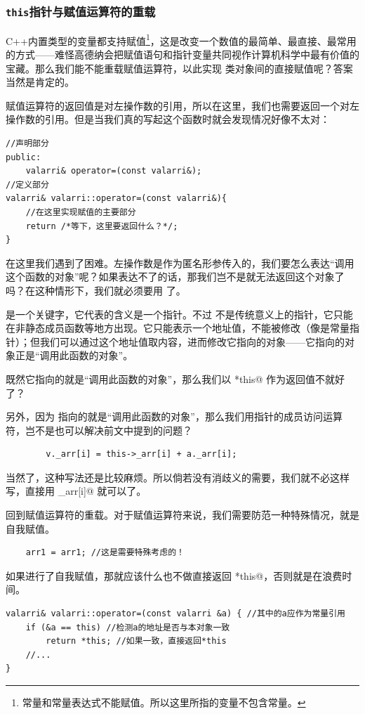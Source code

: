 \subsubsection*{\texttt{this}指针与赋值运算符的重载}
C++内置类型的变量都支持赋值\footnote{常量和常量表达式不能赋值。所以这里所指的变量不包含常量。}，这是改变一个数值的最简单、最直接、最常用的方式——难怪高德纳会把赋值语句和指针变量共同视作计算机科学中最有价值的宝藏。那么我们能不能重载赋值运算符，以此实现 \lstinline@valarri@ 类对象间的直接赋值呢？答案当然是肯定的。\par
赋值运算符的返回值是对左操作数的引用，所以在这里，我们也需要返回一个对左操作数的引用。但是当我们真的写起这个函数时就会发现情况好像不太对：
\begin{lstlisting}
//声明部分
public:
    valarri& operator=(const valarri&);
//定义部分
valarri& valarri::operator=(const valarri&){
    //在这里实现赋值的主要部分
    return /*等下，这里要返回什么？*/;
}
\end{lstlisting}
在这里我们遇到了困难。左操作数是作为匿名形参传入的，我们要怎么表达``调用这个函数的对象''呢？如果表达不了的话，那我们岂不是就无法返回这个对象了吗？在这种情形下，我们就必须要用 \lstinline@this@ 了。\par
\lstinline@this@ 是一个关键字，它代表的含义是一个指针。不过 \lstinline@this@ 不是传统意义上的指针，它只能在非静态成员函数等地方出现。它只能表示一个地址值，不能被修改（像是常量指针）；但我们可以通过这个地址值取内容，进而修改它指向的对象——它指向的对象正是``调用此函数的对象''。\par
既然它指向的就是``调用此函数的对象''，那么我们以 \lstinline@*this@ 作为返回值不就好了？\par
另外，因为 \lstinline@this@ 指向的就是``调用此函数的对象''，那么我们用指针的成员访问运算符，岂不是也可以解决前文中提到的问题？
\begin{lstlisting}
        v._arr[i] = this->_arr[i] + a._arr[i];
\end{lstlisting}
当然了，这种写法还是比较麻烦。所以倘若没有消歧义的需要，我们就不必这样写，直接用 \lstinline@_arr[i]@ 就可以了。\par
回到赋值运算符的重载。对于赋值运算符来说，我们需要防范一种特殊情况，就是自我赋值。
\begin{lstlisting}
    arr1 = arr1; //这是需要特殊考虑的！
\end{lstlisting}
如果进行了自我赋值，那就应该什么也不做直接返回 \lstinline@*this@，否则就是在浪费时间。\pagebreak
\begin{lstlisting}
valarri& valarri::operator=(const valarri &a) { //其中的a应作为常量引用
    if (&a == this) //检测a的地址是否与本对象一致
        return *this; //如果一致，直接返回*this
    //...
}
\end{lstlisting}\par
